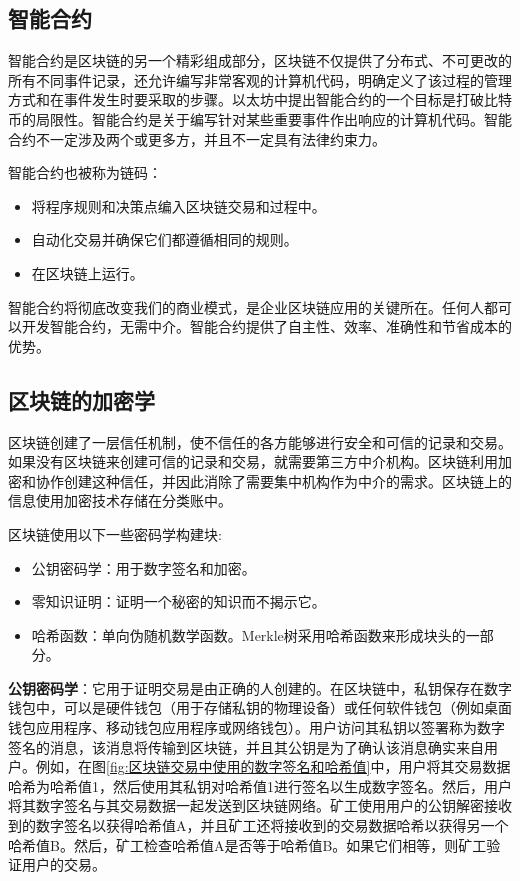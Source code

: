 \begin{translation}
\subsection{智能合约}

智能合约是区块链的另一个精彩组成部分，区块链不仅提供了分布式、不可更改的所有不同事件记录，还允许编写非常客观的计算机代码，明确定义了该过程的管理方式和在事件发生时要采取的步骤。以太坊中提出智能合约的一个目标是打破比特币的局限性。智能合约是关于编写针对某些重要事件作出响应的计算机代码。智能合约不一定涉及两个或更多方，并且不一定具有法律约束力\cite{art41}。

智能合约也被称为链码\cite{art41}：
\begin{itemize}
    \item 将程序规则和决策点编入区块链交易和过程中。
    \item 自动化交易并确保它们都遵循相同的规则。
    \item 在区块链上运行。
\end{itemize}

智能合约将彻底改变我们的商业模式，是企业区块链应用的关键所在。任何人都可以开发智能合约，无需中介。智能合约提供了自主性、效率、准确性和节省成本的优势。

\subsection{区块链的加密学}

区块链创建了一层信任机制，使不信任的各方能够进行安全和可信的记录和交易。如果没有区块链来创建可信的记录和交易，就需要第三方中介机构。区块链利用加密和协作创建这种信任，并因此消除了需要集中机构作为中介的需求。区块链上的信息使用加密技术存储在分类账中。

区块链使用以下一些密码学构建块\cite{art41}:
\begin{itemize}
    \item 公钥密码学：用于数字签名和加密。
    \item 零知识证明：证明一个秘密的知识而不揭示它。
    \item 哈希函数：单向伪随机数学函数。Merkle树采用哈希函数来形成块头的一部分。
\end{itemize}

\textbf{公钥密码学}：它用于证明交易是由正确的人创建的。在区块链中，私钥保存在数字钱包中，可以是硬件钱包（用于存储私钥的物理设备）或任何软件钱包（例如桌面钱包应用程序、移动钱包应用程序或网络钱包）。用户访问其私钥以签署称为数字签名的消息，该消息将传输到区块链，并且其公钥是为了确认该消息确实来自用户。例如，在图\ref{fig:区块链交易中使用的数字签名和哈希值}中，用户将其交易数据哈希为哈希值1，然后使用其私钥对哈希值1进行签名以生成数字签名。然后，用户将其数字签名与其交易数据一起发送到区块链网络。矿工使用用户的公钥解密接收到的数字签名以获得哈希值A，并且矿工还将接收到的交易数据哈希以获得另一个哈希值B。然后，矿工检查哈希值A是否等于哈希值B。如果它们相等，则矿工验证用户的交易。


\end{translation}
